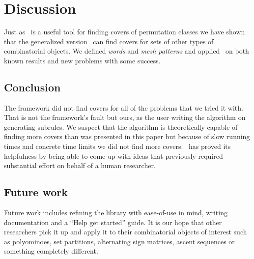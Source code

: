 \chapter{Discussion\label{cha:discussion}}

Just as \Struct\ is a useful tool for finding covers of permutation classes we 
have shown that the generalized version \CombCov\ can find covers for sets of 
other types of combinatorial objects. We defined \emph{words} and \emph{mesh 
patterns} and applied \CombCov\ on both known results and new problems with some 
success.


\section{Conclusion\label{sec:conclusions}}

The framework did not find covers for all of the problems that we tried it with. 
That is not the framework's fault but ours, as the user writing the algorithm on 
generating subrules. We suspect that the algorithm is theoretically capable of 
finding more covers than was presented in this paper but because of slow running 
times and concrete time limits we did not find more covers. \CombCov\ has proved 
its helpfulness by being able to come up with ideas that previously required 
substantial effort on behalf of a human researcher. 


\section{Future work\label{sec:future work}}

Future work includes refining the library with ease-of-use in mind, writing 
documentation and a ``Help get started'' guide. It is our hope that other 
researchers pick it up and apply it to their combinatorial objects of interest 
such as polyominoes, set partitions, alternating sign matrices, ascent sequences 
or something completely different.
